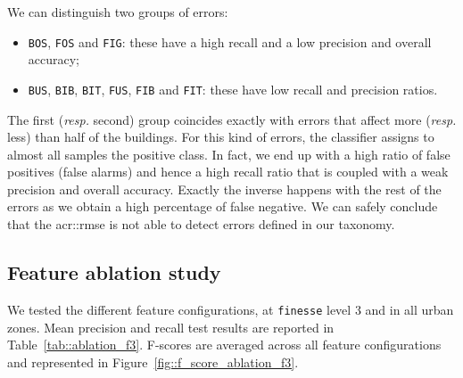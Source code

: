         We can distinguish two groups of errors: 
        \begin{itemize}[label=\(\blacktriangleright\)]
            \item \texttt{BOS}, \texttt{FOS} and \texttt{FIG}: these have a high recall and a low precision and overall accuracy;
            \item \texttt{BUS}, \texttt{BIB}, \texttt{BIT}, \texttt{FUS}, \texttt{FIB} and \texttt{FIT}: these have low recall and precision ratios.
        \end{itemize}
        The first (\textit{resp.} second) group coincides exactly with errors that affect more (\textit{resp.} less) than half of the buildings.
        For this kind of errors, the classifier assigns to almost all samples the positive class.
        In fact, we end up with a high ratio of false positives (false alarms) and hence a high recall ratio that is coupled with a weak precision and overall accuracy.
        Exactly the inverse happens with the rest of the errors as we obtain a high percentage of false negative.
        We can safely conclude that the \gls{acr::rmse} is not able to detect errors defined in our taxonomy.

    \subsection{Feature ablation study}
        \label{subsec::experiments::baseline_feature_analysis::ablation}
        We tested the different feature configurations, at \texttt{finesse} level 3 and in all urban zones.
        Mean precision and recall test results are reported in Table~\ref{tab::ablation_f3}.
        F-scores are averaged across all feature configurations and represented in Figure~\ref{fig::f_score_ablation_f3}.\\

